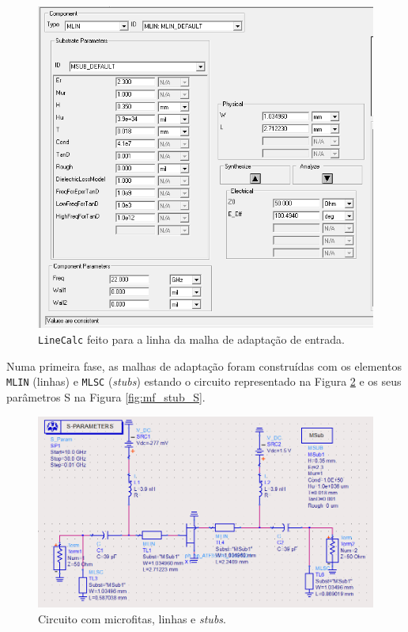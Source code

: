 \documentclass[11pt]{article}
\numberwithin{equation}{section}
\begin{document}
\begin{figure}[H]
	\centering
	\includegraphics[keepaspectratio=true, scale=0.35]{exps/LineCalc}
	\vspace{-0.5em}
	\caption{\texttt{LineCalc} feito para a linha da malha de adaptação de entrada.}
	\vspace{-0.8em}
	\label{fig:LineCalc}
\end{figure}

Numa primeira fase, as malhas de adaptação foram construídas com os elementos \texttt{MLIN} (linhas) e \texttt{MLSC} (\textit{stubs}) estando o circuito representado na Figura \ref{fig:mf_stub_circuito} e os seus parâmetros S na Figura \ref{fig:mf_stub_S}.

\begin{figure}[H]
	\centering
	\includegraphics[keepaspectratio=true, scale=0.45]{exps/Circuito_mf_stub}
	\vspace{-0.5em}
	\caption{Circuito com microfitas, linhas e \textit{stubs}.}
	\vspace{-0.8em}
	\label{fig:mf_stub_circuito}
\end{figure}
\end{document}
